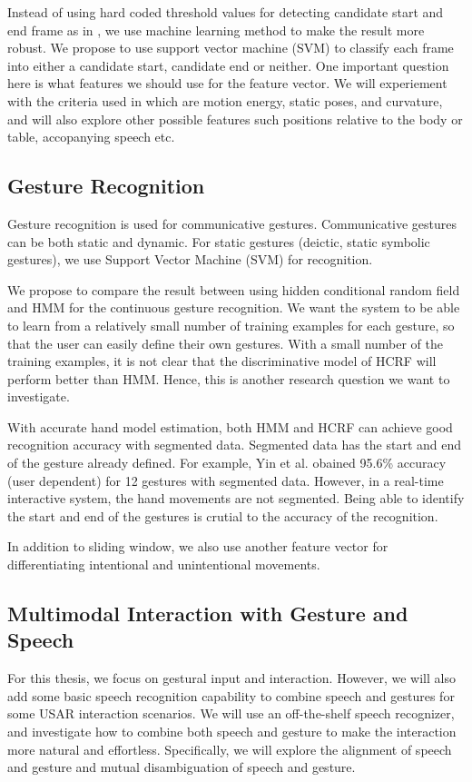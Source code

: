 Instead of using hard coded threshold values for detecting candidate
start and end frame as in \cite{kang04}, we use machine learning method to make
the result more robust. We propose to use support vector machine (SVM) to
classify each frame into either a candidate start, candidate end or neither. One
important question here is what features we should use for the feature vector.
We will experiement with the criteria used in \cite{kang04} which are motion
energy, static poses, and curvature, and will also explore other possible
features such positions relative to the body or table, accopanying speech etc. 


\subsection{Gesture Recognition}
Gesture recognition is used for communicative
gestures. Communicative gestures can be both static and dynamic. For static 
gestures (deictic, static symbolic gestures), we use Support Vector Machine
(SVM) for recognition. 

We propose to compare the result between using hidden conditional random field
and HMM for the continuous gesture recognition. We want the system to be able to
learn from a relatively small number of training examples for each gesture, so
that the user can easily define their own gestures. With a small number of the
training examples, it is not clear that the discriminative model of HCRF will
perform better than HMM. Hence, this is another research question we want to
investigate.

With accurate hand model estimation, both HMM and HCRF can achieve good
recognition accuracy with segmented data. Segmented data has the start and end
of the gesture already defined. For example, Yin et al. obained 95.6\% accuracy
(user dependent) for 12 gestures with segmented data. However, in a real-time
interactive system, the hand movements are not segmented. Being able to identify
the start and end of the gestures is crutial to the accuracy of the recognition.

In addition to sliding window, we also use another feature vector for
differentiating intentional and unintentional movements.

\subsection{Multimodal Interaction with Gesture and Speech} 
For this thesis, we focus on gestural input and interaction. However, we will
also add some basic speech recognition capability to combine speech and gestures
for some USAR interaction scenarios. We will use an off-the-shelf speech 
recognizer, and investigate how to combine both speech and gesture to make
the interaction more natural and effortless. Specifically, we will explore the
alignment of speech and gesture and mutual disambiguation of speech and gesture. 

